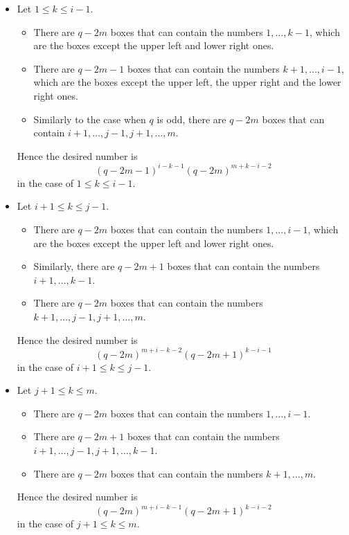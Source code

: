 \documentclass{article}
\theoremstyle{plain}
\theoremstyle{definition}
\theoremstyle{remark}
\numberwithin{equation}{section}
\begin{document}
\begin{itemize}
\item[(i\hspace{-0.5mm}i-1)] Let $1 \leq k \leq i-1$. 
\begin{itemize}
\item There are $q-2m$ boxes that can contain the numbers $1,\ldots,k-1$, which are the boxes except the upper left and lower right ones. 
\item There are $q-2m-1$ boxes that can contain the numbers $k+1,\ldots,i-1$, which are the boxes except the upper left, the upper right and the lower right ones. 
\item Similarly to the case when $q$ is odd, 
there are $q-2m$ boxes that can contain $i+1,\ldots,j-1, j+1,\ldots,m$. 
\end{itemize}
Hence the desired number is 
\[
(q-2m-1)^{i-k-1}(q-2m)^{m+k-i-2}
\] 
in the case of $1 \leq k \leq i-1$. 

\item[(i\hspace{-0.5mm}i-2)] Let $i+1 \leq k \leq j-1$. 
\begin{itemize}
\item There are $q-2m$ boxes that can contain the numbers $1,\ldots,i-1$, which are the boxes except the upper left and lower right ones. 
\item Similarly, there are $q-2m+1$ boxes that can contain the numbers $i+1,\ldots,k-1$. 
\item There are $q-2m$ boxes that can contain the numbers $k+1,\ldots,j-1, j+1,\ldots,m$. 
\end{itemize}
Hence the desired number is 
\[
(q-2m)^{m+i-k-2}(q-2m+1)^{k-i-1}
\]
in the case of $i+1 \leq k \leq j-1$. 

\item[(i\hspace{-0.5mm}i-3)] Let $j+1 \leq k \leq m$. 
\begin{itemize}
\item There are $q-2m$ boxes that can contain the numbers $1,\ldots,i-1$. 
\item There are $q-2m+1$ boxes that can contain the numbers $i+1,\ldots,j-1, j+1,\ldots,k-1$. 
\item There are $q-2m$ boxes that can contain the numbers $k+1,\ldots,m$. 
\end{itemize}
Hence the desired number is 
\[
(q-2m)^{m+i-k-1}(q-2m+1)^{k-i-2}
\] 
in the case of $j+1 \leq k \leq m$. 
\end{itemize}
\end{document}
